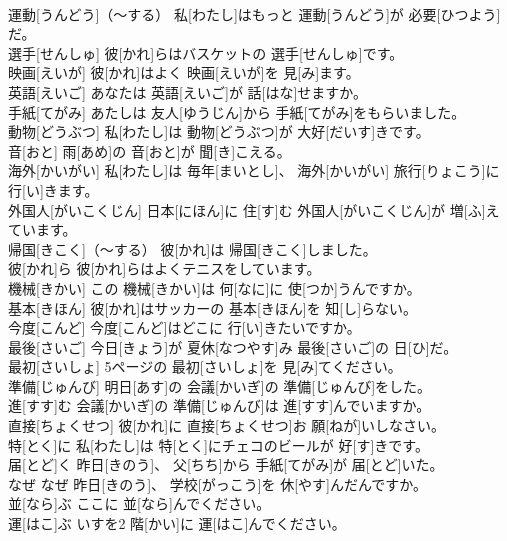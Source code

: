 \documentclass[8pt]{extreport}
\begin{document}
\begin{CJK}{UTF8}{min}
\\	運動[うんどう]（～する）	私[わたし]はもっと 運動[うんどう]が 必要[ひつよう]だ。		
\\	選手[せんしゅ]	彼[かれ]らはバスケットの 選手[せんしゅ]です。		
\\	映画[えいが]	彼[かれ]はよく 映画[えいが]を 見[み]ます。		
\\	英語[えいご]	あなたは 英語[えいご]が 話[はな]せますか。		
\\	手紙[てがみ]	あたしは 友人[ゆうじん]から 手紙[てがみ]をもらいました。		
\\	動物[どうぶつ]	私[わたし]は 動物[どうぶつ]が 大好[だいす]きです。		
\\	音[おと]	雨[あめ]の 音[おと]が 聞[き]こえる。		
\\	海外[かいがい]	私[わたし]は 毎年[まいとし]、 海外[かいがい] 旅行[りょこう]に 行[い]きます。		
\\	外国人[がいこくじん]	日本[にほん]に 住[す]む 外国人[がいこくじん]が 増[ふ]えています。		
\\	帰国[きこく]（～する）	彼[かれ]は 帰国[きこく]しました。		
\\	彼[かれ]ら	彼[かれ]らはよくテニスをしています。		
\\	機械[きかい]	この 機械[きかい]は 何[なに]に 使[つか]うんですか。		
\\	基本[きほん]	彼[かれ]はサッカーの 基本[きほん]を 知[し]らない。		
\\	今度[こんど]	今度[こんど]はどこに 行[い]きたいですか。		
\\	最後[さいご]	今日[きょう]が 夏休[なつやす]み 最後[さいご]の 日[ひ]だ。		
\\	最初[さいしょ]	5ページの 最初[さいしょ]を 見[み]てください。		
\\	準備[じゅんび]	明日[あす]の 会議[かいぎ]の 準備[じゅんび]をした。		
\\	進[すす]む	会議[かいぎ]の 準備[じゅんび]は 進[すす]んでいますか。		
\\	直接[ちょくせつ]	彼[かれ]に 直接[ちょくせつ]お 願[ねが]いしなさい。		
\\	特[とく]に	私[わたし]は 特[とく]にチェコのビールが 好[す]きです。		
\\	届[とど]く	昨日[きのう]、 父[ちち]から 手紙[てがみ]が 届[とど]いた。		
\\	なぜ	なぜ 昨日[きのう]、 学校[がっこう]を 休[やす]んだんですか。		
\\	並[なら]ぶ	ここに 並[なら]んでください。		
\\	運[はこ]ぶ	いすを2 階[かい]に 運[はこ]んでください。		

\end{CJK}
\end{document}
